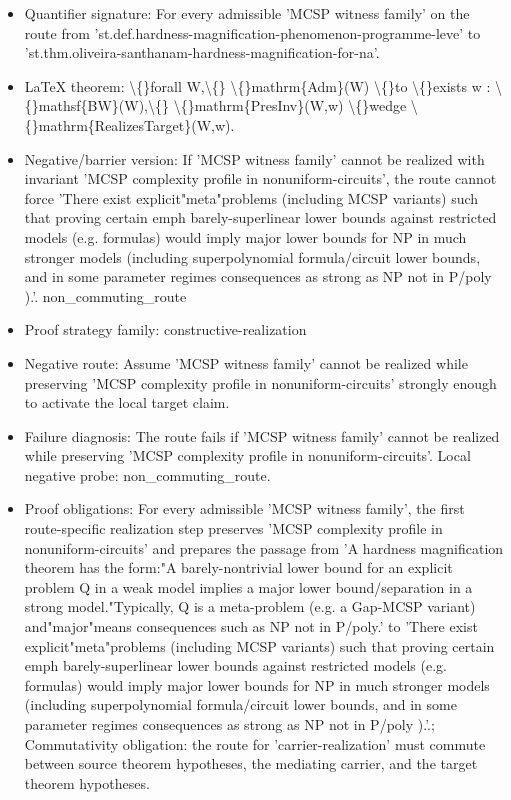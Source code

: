 \documentclass[11pt]{article}
\begin{document}
\begin{itemize}
\item Quantifier signature: For every admissible 'MCSP witness family' on the route from 'st.def.hardness-magnification-phenomenon-programme-leve' to 'st.thm.oliveira-santhanam-hardness-magnification-for-na'.
\item LaTeX theorem: \textbackslash\{\}forall W,\textbackslash\{\} \textbackslash\{\}mathrm\{Adm\}(W) \textbackslash\{\}to \textbackslash\{\}exists w : \textbackslash\{\}mathsf\{BW\}(W),\textbackslash\{\} \textbackslash\{\}mathrm\{PresInv\}(W,w) \textbackslash\{\}wedge \textbackslash\{\}mathrm\{RealizesTarget\}(W,w).
\item Negative/barrier version: If 'MCSP witness family' cannot be realized with invariant 'MCSP complexity profile in nonuniform-circuits', the route cannot force 'There exist explicit"meta"problems (including MCSP variants) such that proving certain emph barely-superlinear lower bounds against restricted models (e.g. formulas) would imply major lower bounds for NP in much stronger models (including superpolynomial formula/circuit lower bounds, and in some parameter regimes consequences as strong as NP not in P/poly ).'. non\_commuting\_route
\item Proof strategy family: constructive-realization
\item Negative route: Assume 'MCSP witness family' cannot be realized while preserving 'MCSP complexity profile in nonuniform-circuits' strongly enough to activate the local target claim.
\item Failure diagnosis: The route fails if 'MCSP witness family' cannot be realized while preserving 'MCSP complexity profile in nonuniform-circuits'. Local negative probe: non\_commuting\_route.
\item Proof obligations: For every admissible 'MCSP witness family', the first route-specific realization step preserves 'MCSP complexity profile in nonuniform-circuits' and prepares the passage from 'A hardness magnification theorem has the form:"A barely-nontrivial lower bound for an explicit problem Q in a weak model implies a major lower bound/separation in a strong model."Typically, Q is a meta-problem (e.g. a Gap-MCSP variant) and"major"means consequences such as NP not in P/poly.' to 'There exist explicit"meta"problems (including MCSP variants) such that proving certain emph barely-superlinear lower bounds against restricted models (e.g. formulas) would imply major lower bounds for NP in much stronger models (including superpolynomial formula/circuit lower bounds, and in some parameter regimes consequences as strong as NP not in P/poly ).'.; Commutativity obligation: the route for 'carrier-realization' must commute between source theorem hypotheses, the mediating carrier, and the target theorem hypotheses.

\end{itemize}
\end{document}
